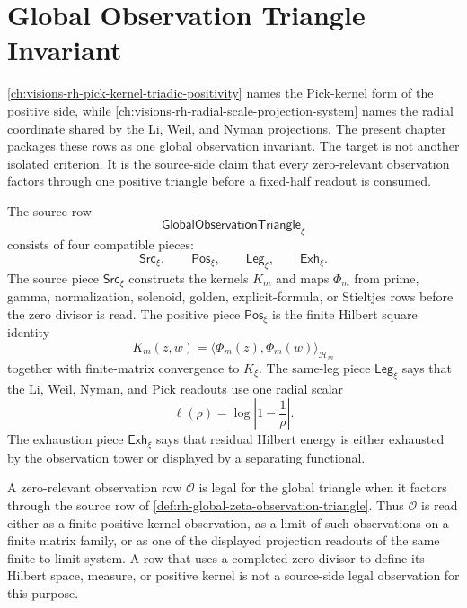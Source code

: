 \chapter{Global Observation Triangle Invariant}
\label{ch:visions-rh-global-observation-triangle-invariant}

\autoref{ch:visions-rh-pick-kernel-triadic-positivity} names the
Pick-kernel form of the positive side, while
\autoref{ch:visions-rh-radial-scale-projection-system} names the
radial coordinate shared by the Li, Weil, and Nyman projections.  The
present chapter packages these rows as one global observation invariant.
The target is not another isolated criterion.  It is the source-side
claim that every zero-relevant observation factors through one positive
triangle before a fixed-half readout is consumed.

\begin{definition}
\label{def:rh-global-zeta-observation-triangle}
The source row
$$
\mathsf{GlobalObservationTriangle}_{\xi}
$$
consists of four compatible pieces:
$$
\mathsf{Src}_{\xi},
\qquad
\mathsf{Pos}_{\xi},
\qquad
\mathsf{Leg}_{\xi},
\qquad
\mathsf{Exh}_{\xi}.
$$
The source piece $\mathsf{Src}_{\xi}$ constructs the kernels
$K_m$ and maps $\Phi_m$ from prime, gamma, normalization, solenoid,
golden, explicit-formula, or Stieltjes rows before the zero divisor is
read.  The positive piece $\mathsf{Pos}_{\xi}$ is the finite Hilbert
square identity
$$
K_m(z,w)=\langle\Phi_m(z),\Phi_m(w)\rangle_{\mathcal H_m}
$$
together with finite-matrix convergence to $K_{\xi}$.  The same-leg
piece $\mathsf{Leg}_{\xi}$ says that the Li, Weil, Nyman, and Pick
readouts use one radial scalar
$$
\ell(\rho)=\log\left|1-\frac1\rho\right|.
$$
The exhaustion piece $\mathsf{Exh}_{\xi}$ says that residual Hilbert
energy is either exhausted by the observation tower or displayed by a
separating functional.
\end{definition}

\begin{definition}
\label{def:rh-legal-global-observation}
A zero-relevant observation row $\mathcal O$ is legal for the global
triangle when it factors through the source row of
\autoref{def:rh-global-zeta-observation-triangle}.  Thus $\mathcal O$
is read either as a finite positive-kernel observation, as a limit of
such observations on a finite matrix family, or as one of the displayed
projection readouts of the same finite-to-limit system.  A row that
uses a completed zero divisor to define its Hilbert space, measure, or
positive kernel is not a source-side legal observation for this
purpose.
\end{definition}

